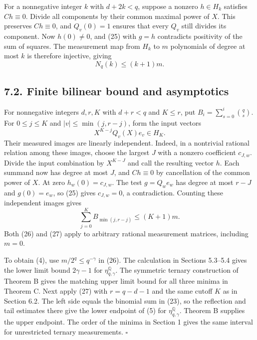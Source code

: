 \documentclass[
  10pt,
]{article}
\begin{document}
For a nonnegative integer \(k\) with \(d+2k<q\), suppose a nonzero \(h\in H_k\) satisfies \(Ch\equiv0\).
Divide all components by their common maximal power of \(X\). This preserves \(Ch\equiv0\), and \(Q_v(0)=1\) ensures that every \(Q_v\) still divides its component. Now \(h(0)\ne0\), and (25) with \(g=h\) contradicts positivity of the sum of squares. The measurement map from \(H_k\) to \(m\) polynomials of degree at most \(k\) is therefore injective, giving
\[
 N_q(k)\le (k+1)m. \tag{26}
\]

\subsection{7.2. Finite bilinear bound and asymptotics}

For nonnegative integers \(d,r,K\) with \(d+r<q\) and \(K\le r\), put \(B_i=\sum_{s=0}^i\binom qs\).
For \(0\le j\le K\) and \(|v|\le\min(j,r-j)\), form the input vectors
\[
 X^{K-j} Q_v(X)e_v\in H_K.
\]
Their measured images are linearly independent. Indeed, in a nontrivial rational relation among these images, choose the largest \(J\) with a nonzero coefficient \(c_{J,w}\). Divide the input combination by \(X^{K-J}\) and call the resulting vector \(h\). Each summand now has degree at most \(J\), and \(Ch\equiv0\) by cancellation of the common power of \(X\). At zero \(h_w(0)=c_{J,w}\). The test \(g=Q_w e_w\) has degree at most \(r-J\) and \(g(0)=e_w\), so (25) gives \(c_{J,w}=0\), a contradiction. Counting these independent images gives
\[
 \sum_{j=0}^K B_{\min(j,r-j)}\le(K+1)m. \tag{27}
\]
Both (26) and (27) apply to arbitrary rational measurement matrices, including \(m=0\).

To obtain (4), use \(m/2^q\le q^{-\gamma}\) in (26). The calculation in Sections 5.3--5.4 gives the lower limit bound \(2\gamma-1\) for \(\eta^{\mathbb Q}_{q,\gamma}\). The symmetric ternary construction of Theorem B gives the matching upper limit bound for all three minima in Theorem C. Next apply (27) with \(r=q-d-1\) and the same cutoff \(K\) as in Section 6.2. The left side equals the binomial sum in (23), so the reflection and tail estimates there give the lower endpoint of (5) for \(\eta^{\mathbb Q}_{q,\gamma}\). Theorem B supplies the upper endpoint. The order of the minima in Section 1 gives the same interval for unrestricted ternary measurements. \(\square\)
\end{document}
